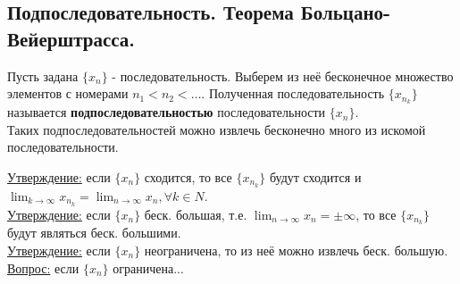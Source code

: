 \documentclass[12pt]{article}
\begin{document}
    \subsection{Подпоследовательность. Теорема Больцано-Вейерштрасса.}
    \noindent Пусть задана $\{x_n\}$ - последовательность. Выберем из неё бесконечное множество элементов с номерами $n_{1} < n_{2} < \dots$. Полученная последовательность $\{x_{n_{k}}\}$ называется \textbf{подпоследовательностью} последовательности $\{x_n\}$.\\
    Таких подпоследовательностей можно извлечь бесконечно много из искомой последовательности.\par\noindent
    \underline{Утверждение:} если $\{x_n\}$ сходится, то все $\{x_{n_{k}}\}$ будут сходится и $\lim_{k\to\infty} x_{n_{k}} = \lim_{n\to\infty} x_n, \forall k \in N$.\\
    \underline{Утверждение:} если $\{x_n\}$ беск. большая, т.е. $\lim_{n\to\infty}x_n = \pm \infty$, то все $\{x_{n_{k}}\}$ будут являться беск. большими.\\
    \underline{Утверждение:} если $\{x_n\}$ неограничена, то из неё можно извлечь беск. большую.\\
    \underline{Вопрос:} если $\{x_n\}$ ограничена...\\
    
\end{document}
